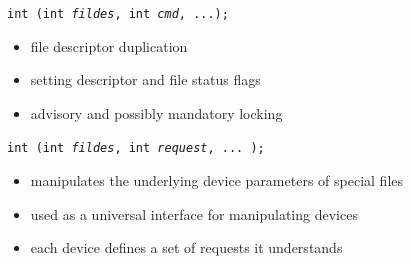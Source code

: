 

\begin{slide}
 \texttt{int (int \emph{fildes}, int
\emph{cmd}, ...);}
\begin{itemize}
\item file descriptor duplication
\item setting descriptor and file status flags
\item advisory and possibly mandatory locking
\end{itemize}

\texttt{int (int \emph{fildes}, int \emph{request}, ... );}
\begin{itemize}
\item manipulates the underlying device parameters of special files
\item used as a universal interface for manipulating devices
\item each device defines a set of requests it understands
\end{itemize}
\end{slide}



